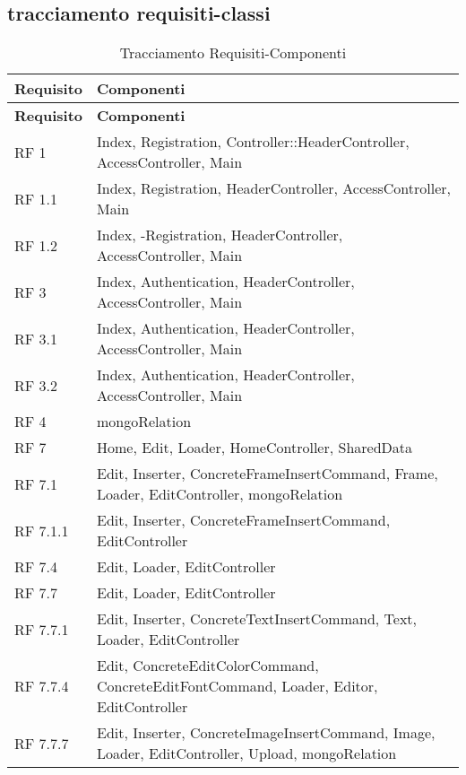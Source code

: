 \subsection{tracciamento requisiti-classi}{
	\begin{center}
	\renewcommand*{\arraystretch}{1.4} 
	\begin{longtable} [c]{| p{2cm} | p{13cm} |} 
	\caption{Tracciamento Requisiti-Componenti \label{tab:traccReqCls}}\\ \hline\textbf{Requisito} & \textbf{Componenti} \\ 
	\hline \endfirsthead \hline 
	\textbf{Requisito} & \textbf{Componenti} \\ 
	\hline \endhead \hline \endfoot \hline \endlastfoot 
	RF 1 & Index, Registration, Controller::\-HeaderController, AccessController, Main\\ 
	 \hline 
	RF 1.1 & Index, Registration, HeaderController, AccessController, Main\\ 
	 \hline 
	RF 1.2 & Index, -Registration, HeaderController, AccessController, Main\\ 
	 \hline 
	RF 3 & Index, Authentication, HeaderController, AccessController, Main\\ 
	 \hline 
	RF 3.1 & Index, Authentication, HeaderController, AccessController, Main\\ 
	 \hline 
	RF 3.2 & Index, Authentication, HeaderController, AccessController, Main\\ 
	 \hline 
	RF 4 & mongoRelation\\ 
	 \hline 
	RF 7 & Home, Edit, Loader, HomeController, SharedData\\ 
	 \hline 
	RF 7.1 & Edit, Inserter, ConcreteFrameInsertCommand, Frame, Loader, EditController, mongoRelation\\ 
	 \hline 
	RF 7.1.1 & Edit, Inserter, ConcreteFrameInsertCommand, EditController\\ 
	 \hline 
	RF 7.4 & Edit, Loader, EditController\\ 
	 \hline 
	RF 7.7 & Edit, Loader, EditController\\ 
	 \hline 
	RF 7.7.1 & Edit, Inserter, ConcreteTextInsertCommand, Text, Loader, EditController\\ 
	 \hline 
	RF 7.7.4 & Edit, ConcreteEditColorCommand, ConcreteEditFontCommand, Loader, Editor, EditController\\ 
	 \hline 
	RF 7.7.7 & Edit, Inserter, ConcreteImageInsertCommand, Image, Loader, EditController, Upload, mongoRelation\\ 

\end{longtable}
\end{center}}
